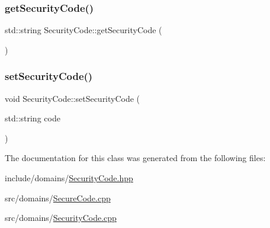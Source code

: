 \subsubsection{\texorpdfstring{getSecurityCode()}{getSecurityCode()}}
{\footnotesize\ttfamily std\+::string Security\+Code\+::get\+Security\+Code (\begin{DoxyParamCaption}{ }\end{DoxyParamCaption})}

\mbox{\label{class_security_code_a027077edcff7484b53def6ba4d94af01}} 
\subsubsection{\texorpdfstring{setSecurityCode()}{setSecurityCode()}}
{\footnotesize\ttfamily void Security\+Code\+::set\+Security\+Code (\begin{DoxyParamCaption}\item[{std\+::string}]{code }\end{DoxyParamCaption})}



The documentation for this class was generated from the following files\+:\begin{DoxyCompactItemize}
\item 
include/domains/\mbox{\hyperlink{_security_code_8hpp}{Security\+Code.\+hpp}}\item 
src/domains/\mbox{\hyperlink{_secure_code_8cpp}{Secure\+Code.\+cpp}}\item 
src/domains/\mbox{\hyperlink{_security_code_8cpp}{Security\+Code.\+cpp}}\end{DoxyCompactItemize}

